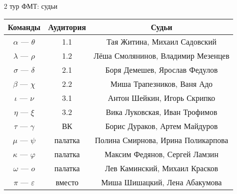 \documentclass[12pt]{article}
\begin{document}
\begin{center}
{\Large 2 тур ФМТ: судьи}
\begin{tabular}{| c | c | c |}
\hline
Команды & Аудитория & Судьи \\ \hline
$\alpha$ --- $\theta$ & 1.1 & Тая Житина, Михаил Садовский \\ \hline
$\lambda$ --- $\rho$ & 1.2 & Лёша Смолянинов, Владимир Мезенцев \\ \hline
$\sigma$ --- $\delta$ & 2.1 & Боря Демешев, Ярослав Федулов \\ \hline
$\beta$ --- $\chi$ & 2.2 & Миша Трапезников, Ваня Адо \\ \hline
$\iota$ --- $\nu$ & 3.1 & Антон Шейкин, Игорь Скрипко \\ \hline
$\eta$ --- $\xi$ & 3.2 & Вика Луковская, Иван Трофимов \\ \hline
$\tau$ --- $\gamma$ & ВК & Борис Дураков, Артем Майдуров \\ \hline
$\mu$ --- $\psi$ & палатка & Полина Смирнова, Ирина Поликарпова \\ \hline
$\kappa$ --- $\varphi$ & палатка & Максим Федянов, Сергей Ламзин \\ \hline
$\omega$ --- $o$ & палатка & Лев Каминский, Михаил Красков \\ \hline
$\pi$ --- $\varepsilon$ & вместо & Миша Шишацкий, Лена Абакумова \\ \hline
\end{tabular}
\end{center}
\end{document}
